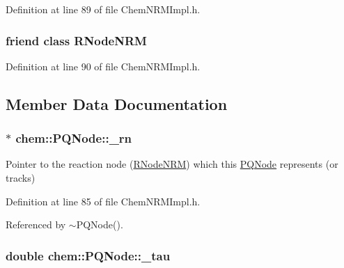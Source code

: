 Definition at line 89 of file Chem\-N\-R\-M\-Impl.\-h.

\hypertarget{classchem_1_1PQNode_a9dfcd0d41325e8ca108cba1768ebab89}{
\subsubsection[{R\-Node\-N\-R\-M}]{\setlength{\rightskip}{0pt plus 5cm}friend class {\bf R\-Node\-N\-R\-M}}}\label{classchem_1_1PQNode_a9dfcd0d41325e8ca108cba1768ebab89}


Definition at line 90 of file Chem\-N\-R\-M\-Impl.\-h.



\subsection{Member Data Documentation}
\hypertarget{classchem_1_1PQNode_ae0ddd94f908ec800ae02f592e83c630d}{
\subsubsection[{\-\_\-rn}]{$\ast$ {\bf chem\-::\-P\-Q\-Node\-::\-\_\-rn}}}\label{classchem_1_1PQNode_ae0ddd94f908ec800ae02f592e83c630d}


Pointer to the reaction node (\hyperlink{classchem_1_1RNodeNRM}{R\-Node\-N\-R\-M}) which this \hyperlink{classchem_1_1PQNode}{P\-Q\-Node} represents (or tracks) 



Definition at line 85 of file Chem\-N\-R\-M\-Impl.\-h.



Referenced by $\sim$\-P\-Q\-Node().

\hypertarget{classchem_1_1PQNode_a77a83fe486c496c3e4bd4ffa72d8fb57}{
\subsubsection[{\-\_\-tau}]{\setlength{\rightskip}{0pt plus 5cm}double {\bf chem\-::\-P\-Q\-Node\-::\-\_\-tau}}}\label{classchem_1_1PQNode_a77a83fe486c496c3e4bd4ffa72d8fb57}


